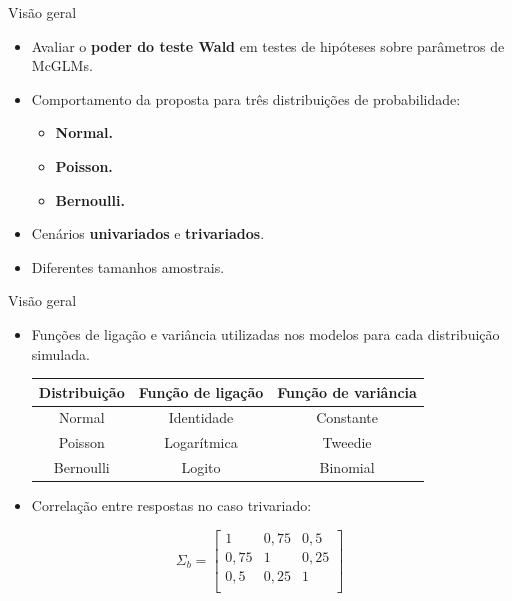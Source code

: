 \documentclass[
  ignorenonframetext,
  serif,
  professionalfont,
  usenames,
  dvipsnames,
  aspectratio = 169]{beamer}
\begin{document}
\begin{frame}{Visão geral}
\protect\hypertarget{visuxe3o-geral}{}
\begin{itemize}
  \itemsep 2ex
    
  \item Avaliar o \textbf{poder do teste Wald} em testes de hipóteses sobre parâmetros de McGLMs. 

  \item Comportamento da proposta para três distribuições de probabilidade: 
    \begin{itemize}
      \item \textbf{Normal.}
        \item \textbf{Poisson.}
        \item \textbf{Bernoulli.}
    \end{itemize}
    
  \item Cenários \textbf{univariados} e \textbf{trivariados}.

  \item Diferentes tamanhos amostrais.
\end{itemize}
\end{frame}

\begin{frame}{Visão geral}
\protect\hypertarget{visuxe3o-geral-1}{}
\begin{itemize}
  \itemsep 2ex
    
  \item Funções de ligação e variância utilizadas nos modelos para cada distribuição simulada.

\begin{table}[H]
\centering
\begin{tabular}{ccc}
\hline
Distribuição & Função de ligação & Função de variância \\ \hline
Normal       & Identidade        & Constante           \\
Poisson      & Logarítmica       & Tweedie             \\
Bernoulli    & Logito            & Binomial            \\ \hline
\end{tabular}
\end{table}

  \item Correlação entre respostas no caso trivariado:

\end{itemize}

\[
\Sigma_b = 
\begin{bmatrix}
1    & 0,75 & 0,5  \\
0,75 & 1    & 0,25 \\
0,5  & 0,25 & 1    \\
\end{bmatrix}
\]
\end{frame}
\end{document}
